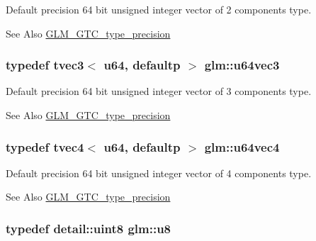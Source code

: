 Default precision 64 bit unsigned integer vector of 2 components type. \begin{DoxySeeAlso}{See Also}
\hyperlink{group__gtc__type__precision}{G\-L\-M\-\_\-\-G\-T\-C\-\_\-type\-\_\-precision} 
\end{DoxySeeAlso}
\hypertarget{group__gtc__type__precision_ga7f104c29d70170cfb2223b29f7985bd4}{
\subsubsection[{u64vec3}]{\setlength{\rightskip}{0pt plus 5cm}typedef tvec3$<$ u64, defaultp $>$ {\bf glm\-::u64vec3}}}\label{group__gtc__type__precision_ga7f104c29d70170cfb2223b29f7985bd4}
Default precision 64 bit unsigned integer vector of 3 components type. \begin{DoxySeeAlso}{See Also}
\hyperlink{group__gtc__type__precision}{G\-L\-M\-\_\-\-G\-T\-C\-\_\-type\-\_\-precision} 
\end{DoxySeeAlso}
\hypertarget{group__gtc__type__precision_gadafdefd5524bf6a48bb7c47edb787ae5}{
\subsubsection[{u64vec4}]{\setlength{\rightskip}{0pt plus 5cm}typedef tvec4$<$ u64, defaultp $>$ {\bf glm\-::u64vec4}}}\label{group__gtc__type__precision_gadafdefd5524bf6a48bb7c47edb787ae5}
Default precision 64 bit unsigned integer vector of 4 components type. \begin{DoxySeeAlso}{See Also}
\hyperlink{group__gtc__type__precision}{G\-L\-M\-\_\-\-G\-T\-C\-\_\-type\-\_\-precision} 
\end{DoxySeeAlso}
\hypertarget{group__gtc__type__precision_ga5e3dc67373d5068997d2d9f41c9024d2}{
\subsubsection[{u8}]{\setlength{\rightskip}{0pt plus 5cm}typedef detail\-::uint8 {\bf glm\-::u8}}}\label{group__gtc__type__precision_ga5e3dc67373d5068997d2d9f41c9024d2}

